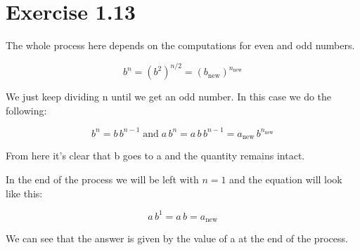 \section{Exercise 1.13}

The whole process here depends on the computations for even and odd numbers.

\begin{equation}
	b^n = \left(b^2\right)^{n/2} = \left(b_{\text{new}}\right)^{n_{\text{new}}}
\end{equation}

We just keep dividing n until we get an odd number. In this case we do the following:

\begin{equation}
	b^n = b\,b^{n-1} \; \text{and} \; a\,b^n = a\,b\,b^{n-1} = a_{\text{new}}\,b^{n_{\text{new}}}
\end{equation}

From here it's clear that b goes to a and the quantity remains intact.

In the end of the process we will be left with $n=1$ and the equation will look like this:

\begin{equation}
	a\,b^1 = a\,b = a_{\text{new}}
\end{equation}

We can see that the answer is given by the value of a at the end of the process.
